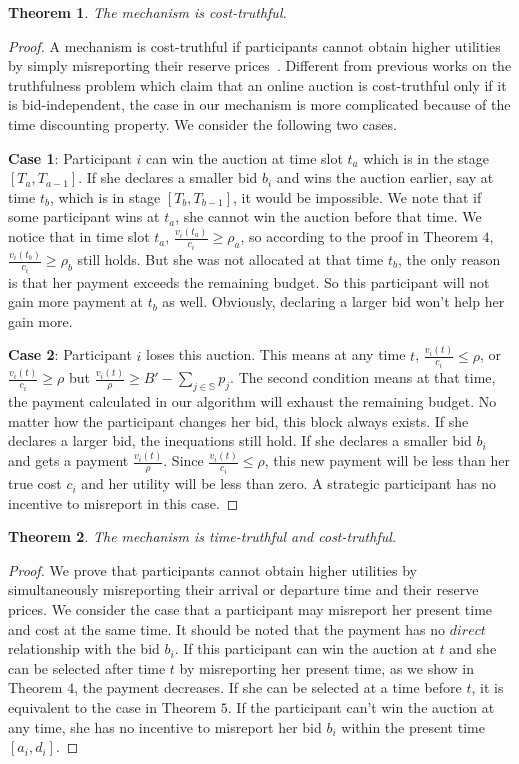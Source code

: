 \documentclass[10pt,journal,letterpaper,compsoc]{IEEEtran}
\newtheorem{theorem}{Theorem}
\begin{document}
\begin{theorem}
The mechanism is cost-truthful.
\end{theorem}

\begin{proof}
A mechanism is cost-truthful if participants cannot obtain higher utilities by simply misreporting their reserve prices~\cite{zhao2014crowdsource}. Different from previous works on the truthfulness problem which claim that an online auction is cost-truthful only if it is bid-independent, the case in our mechanism is more complicated because of the time discounting property. We consider the following two cases.

\textbf{Case 1}: Participant $i$ can win the auction at time slot $t_a$ which is in the stage $[T_a,T_{a-1}]$. If she declares a smaller bid $b_i$ and wins the auction earlier, say at time $t_b$, which is in stage $[T_b,T_{b-1}]$, it would be impossible. We note that if some participant wins at $t_a$, she cannot win the auction before that time. We notice that in time slot $t_a$, $\frac{v_i(t_a)}{c_i} \ge \rho_a$, so according to the proof in Theorem $4$, $\frac{v_i(t_b)}{c_i} \ge \rho_b$ still holds. But she was not allocated at that time $t_b$, the only reason is that her payment exceeds the remaining budget. So this participant will not gain more payment at $t_b$ as well. Obviously, declaring a larger bid won't help her gain more.

\textbf{Case 2}: Participant $i$ loses this auction. This means at any time $t$, $\frac{v_i(t)}{c_i} \le \rho$, or $\frac{v_i(t)}{c_i} \ge \rho$ but $\frac{v_i(t)}{\rho} \ge B'-\sum_{j \in\mathbb{S}}p_j$. The second condition means at that time, the payment calculated in our algorithm will exhaust the remaining budget. No matter how the participant changes her bid, this  block always exists. If she declares a larger bid, the inequations still hold. If she declares a smaller bid $b_i$ and gets a payment $\frac{v_i(t)}{\rho}$. Since $\frac{v_i(t)}{c_i} \le \rho$, this new payment will be less than her true cost $c_i$ and her utility will be less than zero. A strategic participant has no incentive to misreport in this case.
\end{proof}

\begin{theorem}
The mechanism is time-truthful and cost-truthful.
\end{theorem}
\begin{proof}
We prove that participants cannot obtain higher utilities by simultaneously misreporting their arrival or departure time and their reserve prices. We consider the case that a participant may misreport her present time and cost at the same time. It should be noted that the payment has no $direct$ relationship with the bid $b_i$. If this participant can win the auction at $t$ and she can be selected after time $t$ by misreporting her present time, as we show in Theorem $4$, the payment decreases. If she can be selected at a time before $t$, it is equivalent to the case in Theorem $5$. If the participant can't win the auction at any time, she has no incentive to misreport her bid $b_i$ within the present time $[a_i, d_i]$.
\end{proof}
\end{document}
